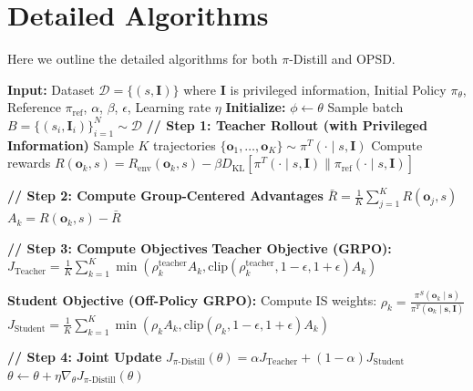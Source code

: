 \newpage
\section{Detailed Algorithms}
Here we outline the detailed algorithms for both $\pi$-Distill and OPSD.


\begin{algorithm}[H]
\label{alg:pi-distill}
\caption{$\pi$}
\label{alg:pi_distill}
\begin{algorithmic}[1]
\STATE \textbf{Input:} Dataset $\mathcal{D} = \{(s, \mathbf{I})\}$ where $\mathbf{I}$ is privileged information, Initial Policy $\pi_\theta$, Reference $\pi_{\text{ref}}$, $\alpha$, $\beta$, $\epsilon$, Learning rate $\eta$
\STATE \textbf{Initialize:} $\phi \leftarrow \theta$ 
    \STATE Sample batch $B = \{(s_i, \mathbf{I}_i)\}_{i=1}^N \sim \mathcal{D}$
    \STATE \textbf{// Step 1: Teacher Rollout (with Privileged Information)}
        \STATE Sample $K$ trajectories $\{\mathbf{o}_1, \dots, \mathbf{o}_K\} \sim \pi^T(\cdot \mid s, \mathbf{I})$
        \STATE Compute rewards $R(\mathbf{o}_k, s) = R_{\text{env}}(\mathbf{o}_k, s) - \beta D_{\text{KL}}[\pi^T(\cdot \mid s, \mathbf{I}) \| \pi_{\text{ref}}(\cdot \mid s, \mathbf{I})]$
    \ENDFOR
    
    \STATE \textbf{// Step 2: Compute Group-Centered Advantages}
        \STATE $\bar{R} = \frac{1}{K}\sum_{j=1}^K R(\mathbf{o}_j, s)$
        \STATE $A_k = R(\mathbf{o}_k, s) - \bar{R}$
    \ENDFOR
    
    \STATE \textbf{// Step 3: Compute Objectives}
    \STATE \textbf{Teacher Objective (GRPO):}
    \STATE $J_{\text{Teacher}} = \frac{1}{K} \sum_{k=1}^K \min \left( \rho_k^{\text{teacher}} A_k, \text{clip}(\rho_k^{\text{teacher}}, 1-\epsilon, 1+\epsilon) A_k \right)$
    
    \STATE \textbf{Student Objective (Off-Policy GRPO):}
    \STATE Compute IS weights: $\rho_k = \frac{\pi^S(\mathbf{o}_k \mid \mathbf{s})}{\pi^T(\mathbf{o}_k \mid \mathbf{s}, \mathbf{I})}$ 
    \STATE $J_{\text{Student}} = \frac{1}{K} \sum_{k=1}^K \min \left( \rho_k A_k, \text{clip}(\rho_k, 1-\epsilon, 1+\epsilon) A_k \right)$
    
    \STATE \textbf{// Step 4: Joint Update}
    \STATE $J_{\pi\text{-Distill}}(\theta) = \alpha J_{\text{Teacher}} + (1 - \alpha) J_{\text{Student}}$
    \STATE $\theta \leftarrow \theta + \eta \nabla_\theta J_{\pi\text{-Distill}}(\theta)$
\ENDWHILE
\end{algorithmic}
\end{algorithm}



